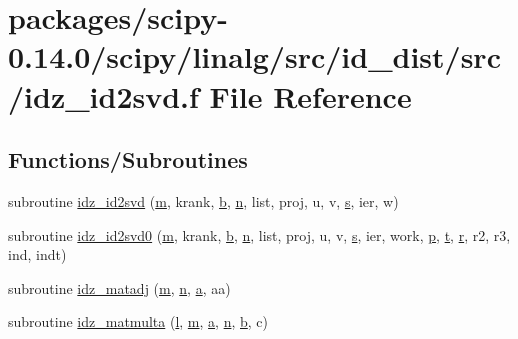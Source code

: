 \hypertarget{idz__id2svd_8f}{}\section{packages/scipy-\/0.14.0/scipy/linalg/src/id\+\_\+dist/src/idz\+\_\+id2svd.f File Reference}
\label{idz__id2svd_8f}
\subsection*{Functions/\+Subroutines}
\begin{DoxyCompactItemize}
\item 
subroutine \hyperlink{idz__id2svd_8f_acfc1407af3d7fcb04f0f05d66839112a}{idz\+\_\+id2svd} (\hyperlink{indexexpr_8h_ab72fdb4031d47b75ab26dd18a437bcdc}{m}, krank, \hyperlink{gen__mat5files_8m_a7b38767b3b6a8dae167e5afa4fc340b0}{b}, \hyperlink{indexexpr_8h_ab427e2e2b4d6cec55fa088ea2a692ace}{n}, list, proj, u, v, \hyperlink{indexexpr_8h_ae024b0db549122b44c349ae28ec990dc}{s}, ier, w)
\item 
subroutine \hyperlink{idz__id2svd_8f_ad09e1744866352d81554a64d93c95bcb}{idz\+\_\+id2svd0} (\hyperlink{indexexpr_8h_ab72fdb4031d47b75ab26dd18a437bcdc}{m}, krank, \hyperlink{gen__mat5files_8m_a7b38767b3b6a8dae167e5afa4fc340b0}{b}, \hyperlink{indexexpr_8h_ab427e2e2b4d6cec55fa088ea2a692ace}{n}, list, proj, u, v, \hyperlink{indexexpr_8h_ae024b0db549122b44c349ae28ec990dc}{s}, ier, work, \hyperlink{indexexpr_8h_a2b8c103eb5bfc196fbc3d29923e28ac1}{p}, \hyperlink{indexexpr_8h_a01709998b82be3f34e0412206618d09d}{t}, \hyperlink{indexexpr_8h_ac434fd11cc2493608d8d91424d60c17e}{r}, r2, r3, ind, indt)
\item 
subroutine \hyperlink{idz__id2svd_8f_afce88567dc351df2625598766c53c9b9}{idz\+\_\+matadj} (\hyperlink{indexexpr_8h_ab72fdb4031d47b75ab26dd18a437bcdc}{m}, \hyperlink{indexexpr_8h_ab427e2e2b4d6cec55fa088ea2a692ace}{n}, \hyperlink{gen__mat5files_8m_aae328bf20413f220e38aec4d95bfd6da}{a}, aa)
\item 
subroutine \hyperlink{idz__id2svd_8f_a1cfa3ba445b2dd09095c4e614ecb64f1}{idz\+\_\+matmulta} (\hyperlink{indexexpr_8h_a88aacdaa46b76729743ee33ef8b95a58}{l}, \hyperlink{indexexpr_8h_ab72fdb4031d47b75ab26dd18a437bcdc}{m}, \hyperlink{gen__mat5files_8m_aae328bf20413f220e38aec4d95bfd6da}{a}, \hyperlink{indexexpr_8h_ab427e2e2b4d6cec55fa088ea2a692ace}{n}, \hyperlink{gen__mat5files_8m_a7b38767b3b6a8dae167e5afa4fc340b0}{b}, c)

\end{DoxyCompactItemize}
